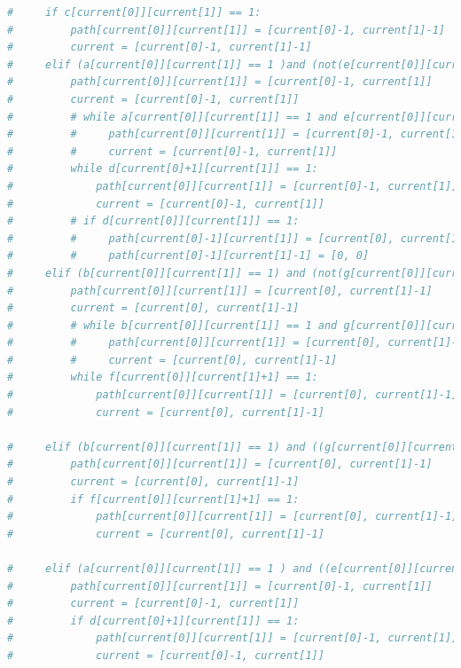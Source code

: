 \documentclass{article}
\begin{document}
\begin{lstlisting}[language=python]
#     if c[current[0]][current[1]] == 1:
#         path[current[0]][current[1]] = [current[0]-1, current[1]-1]
#         current = [current[0]-1, current[1]-1]
#     elif (a[current[0]][current[1]] == 1 )and (not(e[current[0]][current[1]]== 0 and path[current[0]+1][current[1]] == current)and not(e[current[0]][current[1]]== 1 and path[current[0]+1][current[1]] != current)):
#         path[current[0]][current[1]] = [current[0]-1, current[1]]
#         current = [current[0]-1, current[1]]
#         # while a[current[0]][current[1]] == 1 and e[current[0]][current[1]]== 1:
#         #     path[current[0]][current[1]] = [current[0]-1, current[1]]
#         #     current = [current[0]-1, current[1]]
#         while d[current[0]+1][current[1]] == 1:
#             path[current[0]][current[1]] = [current[0]-1, current[1]]
#             current = [current[0]-1, current[1]]
#         # if d[current[0]][current[1]] == 1:
#         #     path[current[0]-1][current[1]] = [current[0], current[1]]
#         #     path[current[0]-1][current[1]-1] = [0, 0]
#     elif (b[current[0]][current[1]] == 1) and (not(g[current[0]][current[1]]== 0 and path[current[0]][current[1]+1] == current)and not(g[current[0]][current[1]]== 1 and path[current[0]][current[1]+1] != current)):
#         path[current[0]][current[1]] = [current[0], current[1]-1]
#         current = [current[0], current[1]-1]
#         # while b[current[0]][current[1]] == 1 and g[current[0]][current[1]]== 1:
#         #     path[current[0]][current[1]] = [current[0], current[1]-1]
#         #     current = [current[0], current[1]-1]
#         while f[current[0]][current[1]+1] == 1:
#             path[current[0]][current[1]] = [current[0], current[1]-1]
#             current = [current[0], current[1]-1]

#     elif (b[current[0]][current[1]] == 1) and ((g[current[0]][current[1]]== 0 and path[current[0]][current[1]+1] == [0,0])):
#         path[current[0]][current[1]] = [current[0], current[1]-1]
#         current = [current[0], current[1]-1]
#         if f[current[0]][current[1]+1] == 1:
#             path[current[0]][current[1]] = [current[0], current[1]-1]
#             current = [current[0], current[1]-1]

#     elif (a[current[0]][current[1]] == 1 ) and ((e[current[0]][current[1]]== 0 and path[current[0]+1][current[1]] == [0,0])):
#         path[current[0]][current[1]] = [current[0]-1, current[1]]
#         current = [current[0]-1, current[1]]
#         if d[current[0]+1][current[1]] == 1:
#             path[current[0]][current[1]] = [current[0]-1, current[1]]
#             current = [current[0]-1, current[1]]




\end{lstlisting}
\end{document}
